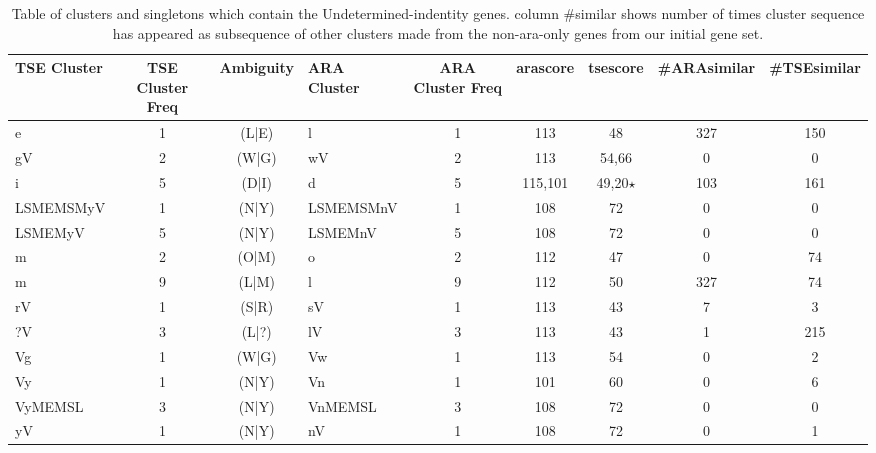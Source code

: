 \documentclass[table,
12pt, %
a4paper, %
oneside, %
headinclude,footinclude, %
BCOR5mm, %
]{scrartcl}
\begin{document}
\begin{table}[htbp]
  \caption{Table of clusters and singletons which contain the Undetermined-indentity genes. column \#similar shows number of times cluster sequence has appeared as subsequence of other clusters made from the non-ara-only genes from our initial gene set.}
  \begin{adjustbox}{width=\textwidth,center}
    \begin{tabular}{|lcclccccc|}
      \hline

      TSE Cluster & TSE Cluster Freq & Ambiguity & ARA Cluster & ARA Cluster Freq & arascore & tsescore     & \#ARAsimilar & \#TSEsimilar \\
      \hline\hline
      e           & 1                & (L|E)     & l           & 1                & 113      & 48           & 327          & 150          \\
      gV          & 2                & (W|G)     & wV          & 2                & 113      & 54,66        & 0            & 0            \\
      i           & 5                & (D|I)     & d           & 5                & 115,101  & 49,20$\star$ & 103          & 161          \\
      LSMEMSMyV   & 1                & (N|Y)     & LSMEMSMnV   & 1                & 108      & 72           & 0            & 0            \\
      LSMEMyV     & 5                & (N|Y)     & LSMEMnV     & 5                & 108      & 72           & 0            & 0            \\
      m           & 2                & (O|M)     & o           & 2                & 112      & 47           & 0            & 74           \\
      m           & 9                & (L|M)     & l           & 9                & 112      & 50           & 327          & 74           \\
      rV          & 1                & (S|R)     & sV          & 1                & 113      & 43           & 7            & 3            \\
      ?V          & 3                & (L|?)     & lV          & 3                & 113      & 43           & 1            & 215          \\
      Vg          & 1                & (W|G)     & Vw          & 1                & 113      & 54           & 0            & 2            \\
      Vy          & 1                & (N|Y)     & Vn          & 1                & 101      & 60           & 0            & 6            \\
      VyMEMSL     & 3                & (N|Y)     & VnMEMSL     & 3                & 108      & 72           & 0            & 0            \\
      yV          & 1                & (N|Y)     & nV          & 1                & 108      & 72           & 0            & 1            \\


\end{tabular}
\end{adjustbox}
\end{table}
\end{document}
